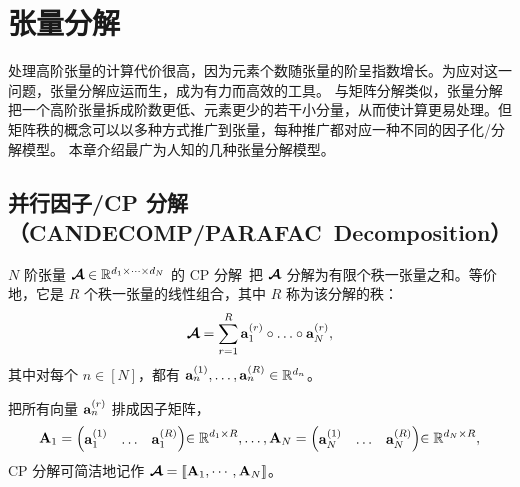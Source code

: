 \section{张量分解}\label{chapter:tensor-decomposition}
处理高阶张量的计算代价很高，因为元素个数随张量的阶呈指数增长。为应对这一问题，张量分解应运而生，成为有力而高效的工具。
与矩阵分解类似，张量分解把一个高阶张量拆成阶数更低、元素更少的若干小分量，从而使计算更易处理。但矩阵秩的概念可以以多种方式推广到张量，每种推广都对应一种不同的因子化/分解模型。
本章介绍最广为人知的几种张量分解模型。
\subsection{并行因子/CP 分解（CANDECOMP/PARAFAC~Decomposition）}\label{sec:cp-decomposition}
$N$ 阶张量 $\bm{\mathcal{A}}\in\mathbb{R}^{d_1\times\cdots\times d_N}$ 的 CP 分解~\citep{hitchcock1927expression}把 $\bm{\mathcal{A}}$ 分解为有限个秩一张量之和。等价地，它是 $R$ 个秩一张量的线性组合，其中 $R$ 称为该分解的秩：
$$\At = \sum_{r=1}^R \ab^{(r)}_1\outprod\dots\outprod\ab^{(r)}_N ,$$
其中对每个 $n\in [N]$，都有 $\mathbf{a}^{(1)}_n,\dots,\mathbf{a}^{(R)}_n\in\mathbb{R}^{d_n}$。

把所有向量 $\mathbf{a}^{(r)}_n$ 排成因子矩阵，
\[\mathbf{A}_1 = {\begin{pmatrix}
\mathbf{a}^{(1)}_1 & \dots & \mathbf{a}^{(R)}_1 \\
\end{pmatrix}}{\in\mathbb{R}^{d_1\times R}}, \dots ,\mathbf{A}_N = {\begin{pmatrix}
\mathbf{a}^{(1)}_N & \dots & \mathbf{a}^{(R)}_N \\
\end{pmatrix}}{\in\mathbb{R}^{d_N\times R}}, \]
CP 分解可简洁地记作 $\bm{\mathcal{A}} = \llbracket \mathbf{A}_1,\cdots,\mathbf{A}_N \rrbracket$。

